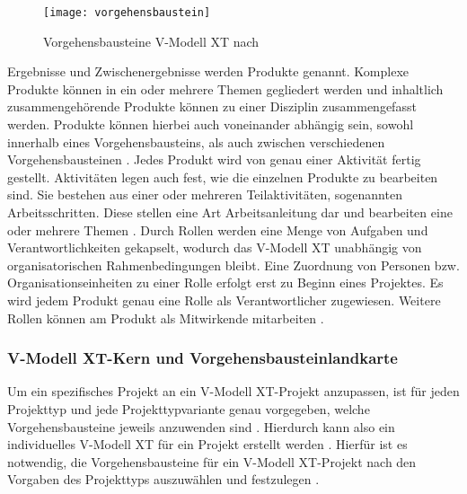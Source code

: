 \begin{figure}[htp]
\begin{center}
  \texttt{[image: vorgehensbaustein]} %
  \caption{Vorgehensbausteine V-Modell XT nach \cite{2004vmodell}}
  \label{fig:vorgehensbausteine}
\end{center}
\end{figure}

Ergebnisse und Zwischenergebnisse werden Produkte genannt. Komplexe Produkte können in ein oder mehrere Themen gegliedert werden und inhaltlich zusammengehörende Produkte können zu einer Disziplin zusammengefasst werden. Produkte können hierbei auch voneinander abhängig sein, sowohl innerhalb eines Vorgehensbausteins, als auch zwischen verschiedenen Vorgehensbausteinen \cite{2004vmodell}.\newline
Jedes Produkt wird von genau einer Aktivität fertig gestellt. Aktivitäten legen auch fest, wie die einzelnen Produkte zu bearbeiten sind. Sie bestehen aus einer oder mehreren Teilaktivitäten, sogenannten Arbeitsschritten. Diese stellen eine Art Arbeitsanleitung dar und bearbeiten eine oder mehrere Themen \cite{2004vmodell}.\newline
Durch Rollen werden eine Menge von Aufgaben und Verantwortlichkeiten gekapselt, wodurch das V-Modell XT unabhängig von organisatorischen Rahmenbedingungen bleibt. Eine Zuordnung von Personen bzw. Organisationseinheiten zu einer Rolle erfolgt erst zu Beginn eines Projektes. Es wird jedem Produkt genau eine Rolle als Verantwortlicher zugewiesen. Weitere Rollen können am Produkt als Mitwirkende mitarbeiten \cite{2004vmodell}. \newline



\subsubsection{V-Modell XT-Kern und Vorgehensbausteinlandkarte}

Um ein spezifisches Projekt an ein V-Modell XT-Projekt anzupassen, ist für jeden Projekttyp und jede Projekttypvariante genau vorgegeben, welche Vorgehensbausteine jeweils anzuwenden sind \cite{2004vmodell}. Hierdurch kann also ein individuelles V-Modell XT für ein Projekt erstellt werden \cite{heinrich2007}. Hierfür ist es notwendig, die Vorgehensbausteine für ein V-Modell XT-Projekt nach den Vorgaben des Projekttyps auszuwählen und festzulegen \cite{2004vmodell}. \newline

